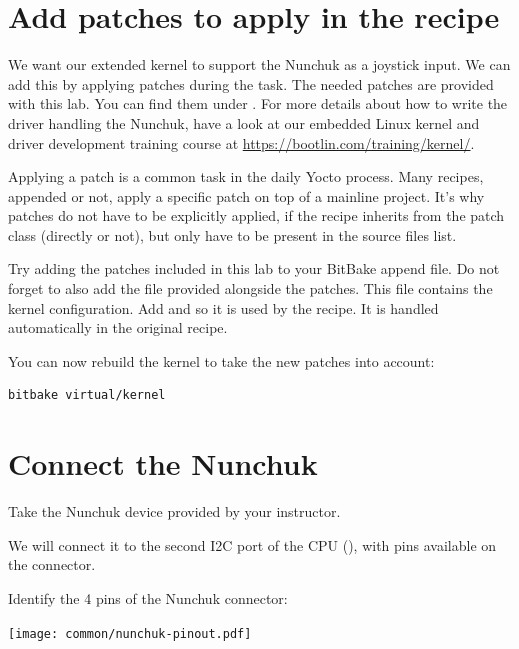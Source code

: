 \section{Add patches to apply in the recipe}

We want our extended
{} kernel to support the Nunchuk as
a joystick input. We can add this by applying patches during the
 task. The needed patches are provided with this lab. You can
find them under . For more
details about how to write the driver handling the Nunchuk, have a look at our
embedded Linux kernel and driver development training course at
\url{https://bootlin.com/training/kernel/}.

Applying a patch is a common task in the daily Yocto process. Many recipes,
appended or not, apply a specific patch on top of a mainline project. It's why
patches do not have to be explicitly applied, if the recipe inherits from the
patch class (directly or not), but only have to be present in the source files
list.

Try adding the patches included in this lab to your BitBake append
file. Do not forget to also add the  file provided
alongside the patches. This file contains the kernel configuration.
\if{}
Add  and  so it is used by the  recipe.
\else
It is handled automatically in the  original recipe.
\fi

You can now rebuild the kernel to take the new patches into account:
\begin{verbatim}
bitbake virtual/kernel
\end{verbatim}

\section{Connect the Nunchuk}

Take the Nunchuk device provided by your instructor.

We will connect it to the second I2C port of the CPU (),
with pins available on the  connector.

Identify the 4 pins of the Nunchuk connector:

\begin{center}
\texttt{[image: common/nunchuk-pinout.pdf]}
\end{center}

